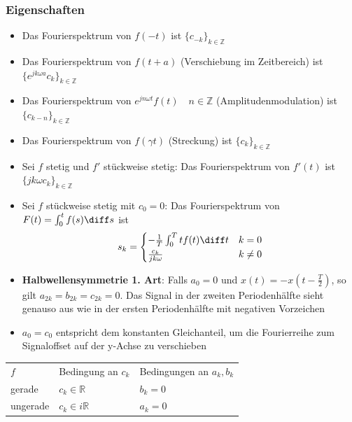 \begin{sectionbox}
    \subsubsection{Eigenschaften}
    \begin{itemize}
        \item Das Fourierspektrum von $f(-t)$ ist $\{c_{-k}\}_{k\in\mathbb Z}$
        \item Das Fourierspektrum von $f(t + a)$ (Verschiebung im Zeitbereich) ist $\{e^{jk\omega a}c_k\}_{k\in\mathbb Z}$
        \item Das Fourierspektrum von $e^{jn\omega t}f(t) \quad n\in\mathbb Z$ (Amplitudenmodulation) ist $\{c_{k-n}\}_{k\in\mathbb Z}$
        \item Das Fourierspektrum von $f(\gamma t)$ (Streckung) ist $\{c_k\}_{k\in\mathbb Z}$
        \item Sei $f$ stetig und $f'$ stückweise stetig: Das Fourierspektrum von $f'(t)$ ist $\{jk\omega c_k\}_{k\in\mathbb Z}$
        \item Sei $f$ stückweise stetig mit $c_0=0$: Das Fourierspektrum von $F(t)=\int_0^t f(s)\diff s$ ist
              \begin{equation*}
                  s_k=\begin{cases}
                      -\frac{1}{T}\int_0^Ttf(t)\diff t & k=0    \\
                      \frac{c_k}{jk\omega}             & k\ne 0
                  \end{cases}
              \end{equation*}
        \item \textbf{Halbwellensymmetrie 1. Art}: Falls $a_0=0$ und $x(t)=-x(t-\frac{T}{2})$, so gilt $a_{2k}=b_{2k}=c_{2k}=0$.
              Das Signal in der zweiten Periodenhälfte sieht genauso aus wie in der ersten Periodenhälfte mit negativen Vorzeichen
        \item $a_0=c_0$ entspricht dem konstanten Gleichanteil, um die Fourierreihe zum Signaloffset auf der y-Achse zu verschieben
    \end{itemize}

    \begin{tabular*}{\columnwidth}{@{\extracolsep\fill}lll@{}}
        $f$ & Bedingung an $c_k$ & Bedingungen an $a_k,b_k$ \\
        gerade & $c_k\in\mathbb R$ & $b_k=0$ \\
        ungerade & $c_k\in i\mathbb R$ & $a_k=0$
    \end{tabular*}
\end{sectionbox}

